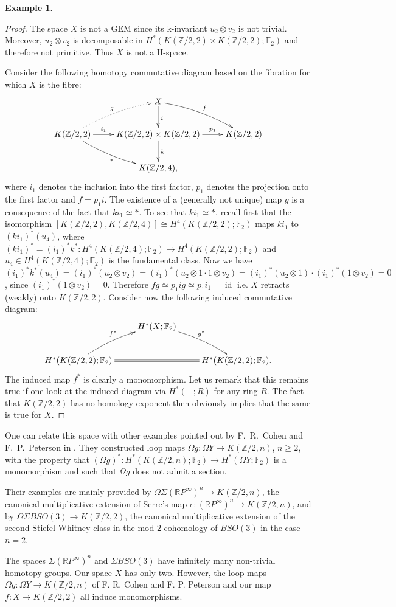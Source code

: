 \documentclass{amsart}
\theoremstyle{definition}
\newtheorem{exmp}[thm]{Example}
\theoremstyle{remark}
\DeclareMathOperator{\id}{id}
\newcommand{\Z}{\mathbb{Z}}
\newcommand{\R}{\mathbb{R}}
\newcommand{\F}{\mathbb{F}}
\renewcommand{\geq}{\geqslant}
\begin{document}
\begin{exmp}
\begin{proof}
The space $X$ is not a GEM since its k-invariant $u_2\otimes v_2$ is not trivial. Moreover, $u_2\otimes v_2$ is decomposable in $H^*(K(\Z/2,2)\times K(\Z/2,2);\F_2)$ and therefore not primitive. Thus $X$ is not a H-space. 

Consider the following homotopy commutative diagram based on the fibration for which $X$ is the fibre:
$$\xymatrix{
&X\ar[d]^i\ar@/^/[rd]^f\\
K(\Z/2,2)\ar[r]^-{i_1}\ar@/^/@{.>}[ru]^g\ar@/_/[rd]_{*} &K(\Z/2,2)\times K(\Z/2,2)\ar[r]^-{p_1}\ar[d]^k &K(\Z/2,2)\\
&K(\Z/2,4),
}$$ where $i_1$ denotes the inclusion into the first factor, $p_1$ denotes the projection onto the first factor and $f=p_1i$. The existence of a (generally not unique) map $g$ is a consequence of the fact that $k i_1\simeq*$. To see that $k i_1\simeq*$, recall first that the isomorphism $[K(\Z/2,2),K(\Z/2,4)]\cong H^4(K(\Z/2,2);\F_2)$ maps $ki_1$ to $(ki_1)^*(u_4)$, where $(ki_1)^*=(i_1)^*k^*:H^4(K(\Z/2,4);\F_2)\to H^4(K(\Z/2,2);\F_2)$ and $u_4\in H^4(K(\Z/2,4);\F_2)$ is the fundamental class. Now we have $(i_1)^*k^*(u_4)=(i_1)^*(u_2\otimes v_2)=(i_1)^*(u_2\otimes1\cdot1\otimes v_2)=(i_1)^*(u_2\otimes1)\cdot(i_1)^*(1\otimes v_2)=0$, since $(i_1)^*(1\otimes v_2)=0$. Therefore $fg\simeq p_1ig\simeq p_1i_1=\id$ i.e. $X$ retracts (weakly) onto $K(\Z/2,2)$. Consider now the following induced commutative diagram:
$$\xymatrix{
&H^*(X;\F_2)\ar@/^/[rd]^{g^*}\\
H^*(K(\Z/2,2);\F_2)\ar@/^/[ru]^{f^*}\ar@{=}[rr] &&H^*(K(\Z/2,2);\F_2).
}$$ The induced map $f^*$ is clearly a monomorphism. Let us remark that this remains true if one look at the induced diagram via $H^*(-;R)$ for any ring $R$. The fact that $K(\Z/2,2)$ has no homology exponent then obviously implies that the same is true for $X$.
\end{proof}

One can relate this space with other examples pointed out by F.~R.~Cohen and F.~P.~Peterson in \cite{CP00}. They constructed loop maps $\Omega g:\Omega Y\to K(\Z/2,n)$, $n\geq2$, with the property that $(\Omega g)^*:H^*(K(\Z/2,n);\F_2)\to H^*(\Omega Y;\F_2)$ is a monomorphism and such that $\Omega g$ does not admit a section. 

Their examples are mainly provided by $\Omega\Sigma(\R P^\infty)^n\to K(\Z/2,n)$, the canonical multiplicative extension of Serre's map $e:(\R P^\infty)^n\to K(\Z/2,n)$, and by $\Omega\Sigma BSO(3)\to K(\Z/2,2)$, the canonical multiplicative extension of the second Stiefel-Whitney class in the mod-$2$ cohomology of $BSO(3)$ in the case $n=2$.

\newpage
The spaces $\Sigma(\R P^\infty)^n$ and $\Sigma BSO(3)$ have infinitely many non-trivial homotopy groups. Our space $X$ has only two. However, the loop maps $\Omega g:\Omega Y\to K(\Z/2,n)$ of F. R. Cohen and F. P. Peterson and our map $f:X\to K(\Z/2,2)$ all induce monomorphisms.
\end{exmp}
\end{document}
